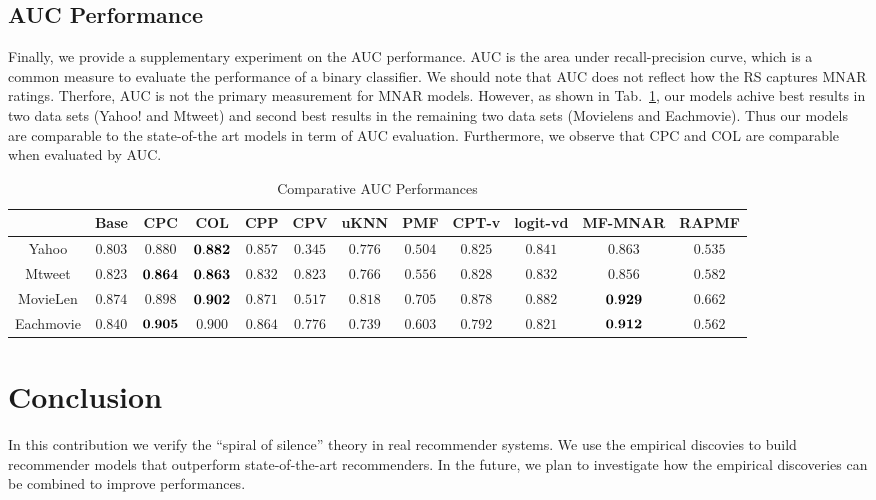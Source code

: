 \documentclass{sig-alternate}
\begin{document}
\subsection{AUC Performance}
Finally, we provide a supplementary experiment on the AUC performance. AUC is the area under recall-precision curve, which is a common measure to evaluate the performance of a binary classifier. We should note that AUC does not reflect how the RS captures MNAR ratings. Therfore, AUC is not the primary measurement for MNAR models. However, as shown in Tab.~\ref{tab:AUC}, our models achive best results in two data sets (Yahoo! and Mtweet) and second best results in the remaining two data sets (Movielens and Eachmovie). Thus our models are comparable to the state-of-the art models in term of AUC evaluation. Furthermore, we observe that CPC and COL are comparable when evaluated by AUC.   

\begin{table}[tbp]
\centering
\caption{Comparative AUC Performances}\label{tab:AUC}
\centering
\begin{tabular}{|c|c|c|c|c|c|c|c|c|c|c|c|}
\hline
& Base & CPC & COL & CPP & CPV & uKNN & PMF & CPT-v & logit-vd & MF-MNAR & RAPMF \\\hline
\hline
Yahoo & $0.803$ & $0.880$ & $\bf{0.882}$ & $0.857$ & $0.345$ & $0.776$ & $0.504$ & $0.825$ & $0.841$ & $0.863$ & $0.535$ \\\hline
Mtweet & $0.823$ & $\bf{0.864}$ & $\bf{0.863}$ & $0.832$ & $0.823$ & $0.766$ & $0.556$ & $0.828$ & $0.832$ & $0.856$ & $0.582$ \\\hline
MovieLen & $0.874$ & $0.898$ & $\bf{0.902}$ & $0.871$ & $0.517$ & $0.818$ & $0.705$ & $0.878$ & $0.882$ & $\bf{0.929}$ & $0.662$ \\\hline
Eachmovie & $0.840$ & $\bf{0.905}$ & $0.900$ & $0.864$ & $0.776$ & $0.739$ & $0.603$ & $0.792$ & $0.821$ & $\bf{0.912}$ & $0.562$ \\\hline
\end{tabular}
\end{table}

\section{Conclusion}\label{sec:conclusion}

In this contribution we verify the ``spiral of silence'' theory in real recommender systems. We use the empirical discovies to build recommender models that outperform state-of-the-art recommenders. In the future, we plan to investigate how the empirical discoveries can be combined to improve performances.
\end{document}
